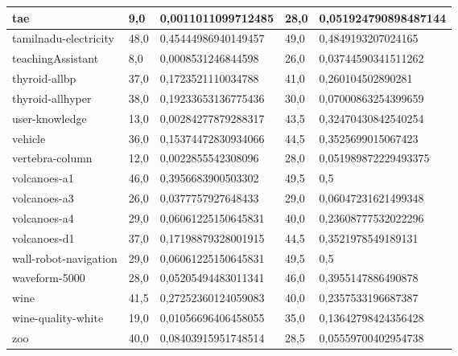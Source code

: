 \documentclass[times,specification,annotation]{itmo-student-thesis}
\begin{document}
\begin{center}
\begin{longtable}{ |m{3.4cm}|m{1.5cm}|m{4.7cm}|m{1.5cm}|m{4.7cm}| }
		\hline
		tae & 9,0 & 0,0011011099712485 & 28,0 & 0,051924790898487144 \\
		\hline
		tamilnadu-electricity & 48,0 & 0,45444986940149457 & 49,0 & 0,4849193207024165 \\
		\hline
		teachingAssistant & 8,0 & 0,0008531246844598 & 26,0 & 0,03744590341511262 \\
		\hline
		thyroid-allbp & 37,0 & 0,1723521110034788 & 41,0 & 0,260104502890281 \\
		\hline
		thyroid-allhyper & 38,0 & 0,19233653136775436 & 30,0 & 0,07000863254399659 \\
		\hline
		user-knowledge & 13,0 & 0,00284277879288317 & 43,5 & 0,32470430842540254 \\
		\hline
		vehicle & 36,0 & 0,15374472830934066 & 44,5 & 0,3525699015067423 \\
		\hline
		vertebra-column & 12,0 & 0,0022855542308096 & 28,0 & 0,051989872229493375 \\
		\hline
		volcanoes-a1 & 46,0 & 0,3956683900503302 & 49,5 & 0,5 \\
		\hline
		volcanoes-a3 & 26,0 & 0,0377757927648433 & 29,0 & 0,06047231621499348 \\
		\hline
		volcanoes-a4 & 29,0 & 0,06061225150645831 & 40,0 & 0,23608777532022296 \\
		\hline
		volcanoes-d1 & 37,0 & 0,17198879328001915 & 44,5 & 0,3521978549189131 \\
		\hline
		wall-robot-navigation & 29,0 & 0,06061225150645831 & 49,5 & 0,5 \\
		\hline
		waveform-5000 & 28,0 & 0,05205494483011341 & 46,0 & 0,3955147886490878 \\
		\hline
		wine & 41,5 & 0,27252360124059083 & 40,0 & 0,2357533196687387 \\
		\hline
		wine-quality-white & 19,0 & 0,01056696406458055 & 35,0 & 0,13642798424356428 \\
		\hline
		zoo & 40,0 & 0,08403915951748514 & 28,5 & 0,05559700402954738 \\
		\hline
		
		
	\end{longtable}
\end{center}
\end{document}
